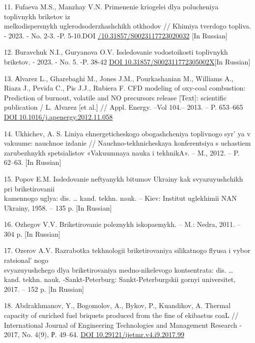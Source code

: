 \begin{references}
11. Fufaeva M.S., Manzhay V.N. Primenenie kriogelei dlya polucheniya
toplivnykh briketov iz \\melkodispersnykh uglerodsoderzhashchikh otkhodov
// Khimiya tverdogo topliva. - 2023. - No. 2-3. -P. 5-10.DOI
\href{https://doi.org/10.31857/S0023117723020032}{/10.31857/S0023117723020032}
{[}In Russian{]}

12. Buravchuk N.I., Guryanova O.V. Issledovanie vodostoikosti toplivnykh
briketov. - 2023. - No. 5. -P. 38-42
\href{https://doi.org/10.31857/S002311772305002X}{DOI
10.31857/S002311772305002X}{[}In Russian{]}

13. Аlvarez L., Gharebaghi M., Jones J.M., Pourkashanian M., Williams
A., Riaza J., Pevida C., Pis J.J., Rubiera F. CFD modeling of oxy-coal
combustion: Prediction of burnout, volatile and NO precursors release
{[}Text{]}: scientific publication / L. Alvarez {[}et al.{]} // Appl.
Energy. --Vol 104.-- 2013. -- P. 653--665
\href{https://doi.org/10.1016/j.apenergy.2012.11.058}{DOI
10.1016/j.apenergy.2012.11.058}

14. Ukhichev, A. S. Liniya ehnergeticheskogo obogashcheniya toplivnogo
syr' ya v vakuume: nauchnoe izdanie //
Nauchno-tekhnicheskaya konferentsiya s uchastiem zarubezhnykh
spetsialistov «Vakuumnaya nauka i tekhnikA». -- M., 2012. -- P. 62--63.
{[}In Russian{]}

15. Popov E.M. Issledovanie neftyanykh bitumov Ukrainy kak
svyazuyushchikh pri briketirovanii \\kamennogo uglya: dis. \ldots{} kand.
tekhn. nauk. -- Kiev: Institut uglekhimii NAN Ukrainy, 1958. -- 135 p.
{[}In Russian{]}

16. Ozhegov V.V. Briketirovanie poleznykh iskopaemykh. -- M.: Nedra,
2011. -- 304 p. {[}In Russian{]}

17. Ozerov A.V. Razrabotka tekhnologii briketirovaniya silikatnogo
flyusa i vybor ratsional' nogo \\svyazuyushchego dlya
briketirovaniya medno-nikelevogo kontsentrata: dis. \ldots{} kand.
tekhn. nauk. -Sankt-Peterburg: Sankt-Peterburgskii gornyi universitet,
2017. -- 152 p. {[}In Russian{]}

18. Abdrakhmanov, Y., Bogomolov, A., Bykov, P., Kuandikov, A. Thermal
capacity of enriched fuel briquets produced from the fine of ekibastus
coaL // International Journal of Engineering Technologies and Management
Research - 2017, No. 4(9), Р. 49--64.
\href{https://doi.org/10.29121/ijetmr.v4.i9.2017.99}{DOI
10.29121/ijetmr.v4.i9.2017.99}
\end{references}

